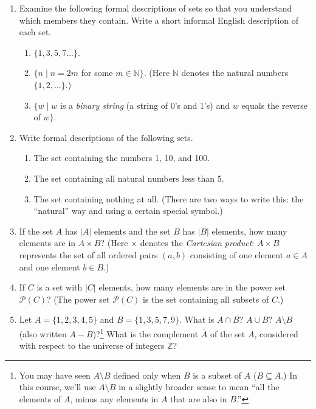 \documentclass[letterpaper,11pt,twoside]{article}
\theoremstyle{plain}
\theoremstyle{definition}
\theoremstyle{remark}
\theoremstyle{restate}
\begin{document}
\begin{enumerate}
    \item Examine the following formal descriptions of sets so that you understand which members they contain. Write a short informal English description of each set.
        \begin{enumerate}
            \item $\{1, 3, 5, 7...\}$.
            
            \item $\{n \; | \; n = 2m$ for some $m \in \mathbb{N}\}$. (Here $\mathbb{N}$ denotes the natural numbers $\{1, 2, \dots\}$.) 
            
            \item $\{w \; | \; w$ is a \emph{binary string} (a string of 0's and 1's) and $w$ equals the reverse of $w\}$.

        \end{enumerate}
    \item Write formal descriptions of the following sets.
        \begin{enumerate}
            \item The set containing the numbers 1, 10, and 100.
            
            \item The set containing all natural numbers less than 5.
            
            \item The set containing nothing at all. (There are two ways to write this: the ``natural'' way and using a certain special symbol.)
            
        \end{enumerate}
    \item If the set $A$ has $|A|$ elements and the set $B$ has $|B|$ elements, how many elements are in $A \times B$? (Here $\times$ denotes the \emph{Cartesian product}: $A \times B$ represents the set of all ordered pairs $(a, b)$ consisting of one element $a \in A$ and one element $b \in B$.)

    \item If $C$ is a set with $|C|$ elements, how many elements are in the power set $\mathcal{P}(C)$? (The power set $\mathcal{P}(C)$ is the set containing all subsets of $C$.)

    \item Let $A = \{1, 2, 3, 4, 5\}$ and $B = \{1, 3, 5, 7, 9\}$. What is $A \cap B$? $A \cup B?$ $A \setminus B$ (also written $A - B$)?\footnote{You may have seen $A \setminus B$ defined only when $B$ is a subset of $A$ ($B \subseteq A$.) In this course, we'll use $A \setminus B$ in a slightly broader sense to mean ``all the elements of $A$, minus any elements in $A$ that are also in $B$.''} What is the complement $\overline{A}$ of the set $A$, considered with respect to the universe of integers $\mathbb{Z}$?


\end{enumerate}
\end{document}
